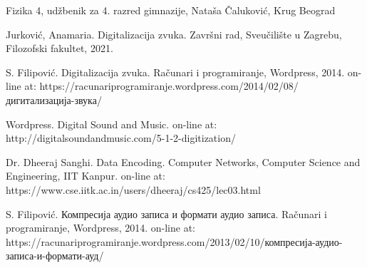 \documentclass[a4paper]{article}
\begin{document}
\appendix

\begin{thebibliography}{9}

 Fizika 4, udžbenik za 4. razred gimnazije, Nataša Čaluković, Krug Beograd   

 Jurković, Anamaria. Digitalizacija zvuka.  Završni rad, Sveučilište u Zagrebu, Filozofski fakultet, 2021.

 S. Filipović. Digitalizacija zvuka. Računari i programiranje, Wordpress, 2014. on-line at: https://racunariprogramiranje.wordpress.com/2014/02/08/дигитализација-звука/

 Wordpress. Digital Sound and Music. on-line at: http://digitalsoundandmusic.com/5-1-2-digitization/

 Dr. Dheeraj Sanghi. Data Encoding. Computer Networks, Computer Science and Engineering, IIT Kanpur. on-line at: https://www.cse.iitk.ac.in/users/dheeraj/cs425/lec03.html

 S. Filipović. Компресија аудио записа и формати аудио записа. Računari i programiranje, Wordpress, 2014. on-line at: https://racunariprogramiranje.wordpress.com/2013/02/10/компресија-аудио-записа-и-формати-ауд/

\end{thebibliography}
\end{document}
